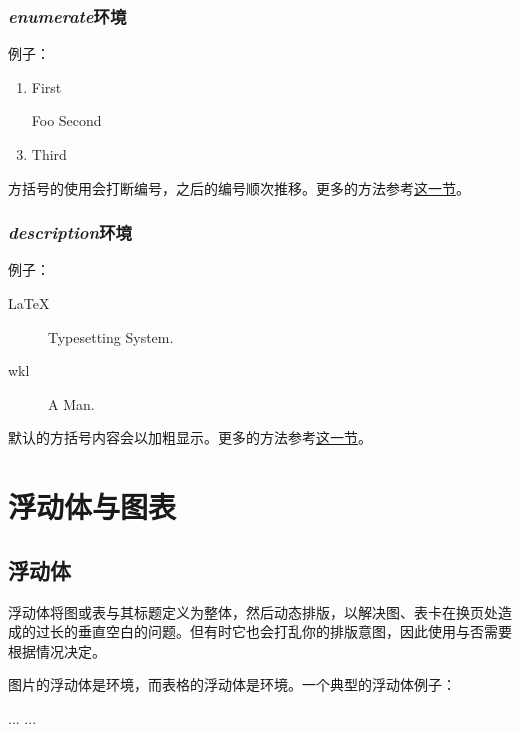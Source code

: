 \subsubsection{\textit{enumerate}环境}
例子：

\begin{codeshow}
\begin{enumerate}
  \item First
  \item[Foo] Second
  \item Third
\end{enumerate}
\end{codeshow}

方括号的使用会打断编号，之后的编号顺次推移。更多的方法参考\hyperref[sec:list]{这一节}。

\subsubsection{\textit{description}环境}
例子：

\begin{codeshow}
\begin{description}
  \item[LaTeX] Typesetting System.
  \item[wkl] A Man.
\end{description}
\end{codeshow}

默认的方括号内容会以加粗显示。更多的方法参考\hyperref[sec:list]{这一节}。

\section{浮动体与图表}
\label{sec:float}

\subsection{浮动体}
浮动体将图或表与其标题定义为整体，然后动态排版，以解决图、表卡在换页处造成的过长的垂直空白的问题。但有时它也会打乱你的排版意图，因此使用与否需要根据情况决定。

图片的浮动体是环境，而表格的浮动体是环境。一个典型的浮动体例子：
\begin{latex}
\begin{table}[!htb]
    \centering
    \caption{table-cap}
    \label{table-name}
    \begin{tabular}{...}
        ...
    \end{tabular}
\end{table}
\end{latex}

